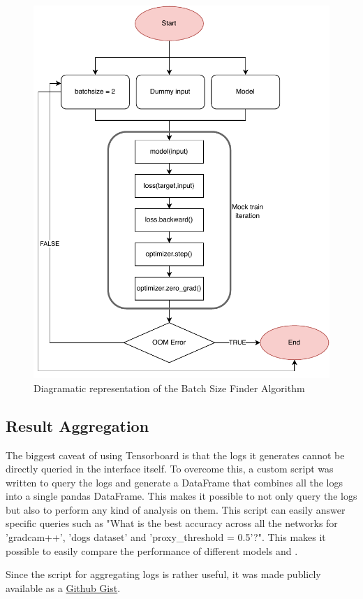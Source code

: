 \begin{figure}[!htb]
    \centering
    \includegraphics[width=0.6\linewidth]{images/batchsizefinder.pdf}
    \caption{Diagramatic representation of the Batch Size Finder Algorithm}
    \label{fig:bsfinder}
\end{figure}

\subsection{Result Aggregation} \label{sec:result_aggregation}
The biggest caveat of using Tensorboard is that the logs it generates cannot be directly queried in the interface itself. To overcome this, a custom script was written to query the logs and generate a DataFrame that combines all the logs into a single pandas DataFrame. This makes it possible to not only query the logs but also to perform any kind of analysis on them. This script can easily answer specific queries such as "What is the best accuracy across all the networks for 'gradcam++', 'dogs dataset' and 'proxy\_threshold = 0.5'?". This makes it possible to easily compare the performance of different models and .

Since the script for aggregating logs is rather useful, it was made publicly available as a \href{https://gist.github.com/SubhadityaMukherjee/58cbdf324812175233e91993b720e0bc}{Github Gist}.

